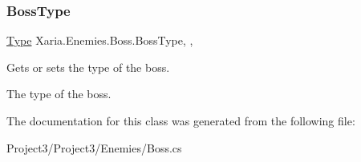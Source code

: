 \subsubsection{\texorpdfstring{Boss\+Type}{BossType}}
{\footnotesize\ttfamily \hyperlink{classXaria_1_1Enemies_1_1Boss_ae95ffc3618433440acbfd7aab7671b02}{Type} Xaria.\+Enemies.\+Boss.\+Boss\+Type\hspace{0.3cm}{\ttfamily [get]}, {\ttfamily [set]}, {\ttfamily [protected]}}



Gets or sets the type of the boss. 

The type of the boss. 

The documentation for this class was generated from the following file\+:\begin{DoxyCompactItemize}
\item 
Project3/\+Project3/\+Enemies/Boss.\+cs\end{DoxyCompactItemize}

